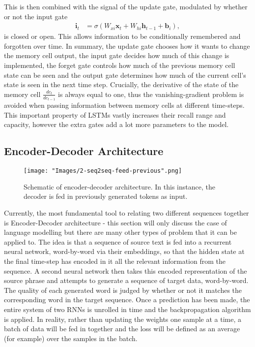 \documentclass[]{article}
\begin{document}
This is then combined with the signal of the update gate, modulated by whether or not the input gate
\begin{align}
\textbf{i}_{t}&=\sigma(W_{xi}\textbf{x}_t+W_{hi}\textbf{h}_{t-1}+\textbf{b}_i),
\end{align}
is closed or open. This allows information to be conditionally remembered and forgotten over time. In summary, the update gate chooses how it wants to change the memory cell output, the input gate decides how much of this change is implemented, the forget gate controls how much of the previous memory cell state can be seen and the output gate determines how much of the current cell's state is seen in the next time step.  Crucially, the derivative of the state of the memory cell $\frac{dc_t}{dc_{t-1}}$ is always equal to one, thus the vanishing-gradient problem is avoided when passing information between memory cells at different time-steps. This important property of LSTMs vastly increases their recall range and capacity, however the extra gates add a lot more parameters to the model. 

\subsection{Encoder-Decoder Architecture}
\begin{figure}	\centering
	\texttt{[image: "Images/2-seq2seq-feed-previous".png]}
	\caption{Schematic of encoder-decoder architecture. In this instance, the decoder is fed in previously generated tokens as input.  }
	\label{fig:encoder-decoder}
\end{figure}
Currently, the most fundamental tool to relating two different sequences together is Encoder-Decoder architecture - this section will only discuss the case of language modelling but there are many other types of problem that it can be applied to. The idea is that a sequence of source text is fed into a recurrent neural network, word-by-word via their embeddings, so that the hidden state at the final time-step has encoded in it all the relevant information from the sequence. A second neural network then takes this encoded representation of the source phrase and attempts to generate a sequence of target data, word-by-word. The quality of each generated word is judged by whether or not it matches the corresponding word in the target sequence. Once a prediction has been made, the entire system of two RNNs is unrolled in time and the backpropagation algorithm is applied. In reality, rather than updating the weights one sample at a time, a batch of data will be fed in together and the loss will be defined as an average (for example) over the samples in the batch. 
\end{document}
